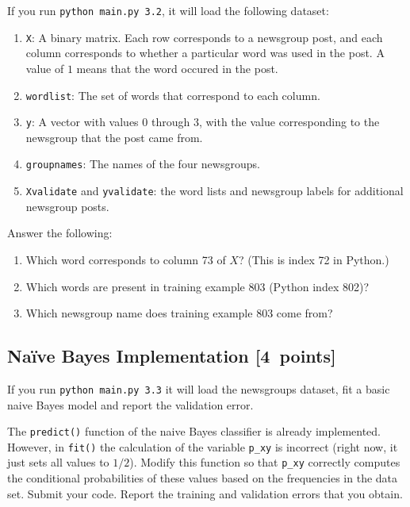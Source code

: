 \documentclass{article}
\newcommand{\blu}[1]{{\textcolor{blu}{#1}}}
\let\ask\blu
\newcommand\pts[1]{\textcolor{pointscolour}{[#1~points]}}
\begin{document}
    If you run \texttt{python main.py 3.2}, it will load the following dataset:
    \begin{enumerate}
        \item \texttt{X}: A binary matrix. Each row corresponds to a newsgroup post, and each column corresponds to whether a particular word was used in the post. A value of $1$ means that the word occured in the post.
        \item \texttt{wordlist}: The set of words that correspond to each column.
        \item \texttt{y}: A vector with values $0$ through $3$, with the value corresponding to the newsgroup that the post came from.
        \item \texttt{groupnames}: The names of the four newsgroups.
        \item \texttt{Xvalidate} and \texttt{yvalidate}: the word lists and newsgroup labels for additional newsgroup posts.
    \end{enumerate}
    \ask{Answer the following}:
    \begin{enumerate}
        \item Which word corresponds to column 73 of $X$? (This is index 72 in Python.)
        \item Which words are present in training example 803 (Python index 802)?
        \item Which newsgroup name does training example 803 come from?
    \end{enumerate}

    \subsection{Na\"ive Bayes Implementation \pts{4}}

    If you run \texttt{python main.py 3.3}
    it will load the newsgroups dataset, fit a basic naive Bayes model and report the validation error.

    The \texttt{predict()} function of the naive Bayes classifier is already implemented.
    However, in \texttt{fit()}
    the calculation of the variable \texttt{p\_xy} is incorrect
    (right now, it just sets all values to $1/2$).
    \ask{Modify this function so that \texttt{p\_xy} correctly
        computes the conditional probabilities of these values based on the
        frequencies in the data set. Submit your code. Report the training and validation errors that you obtain.}
\end{document}
